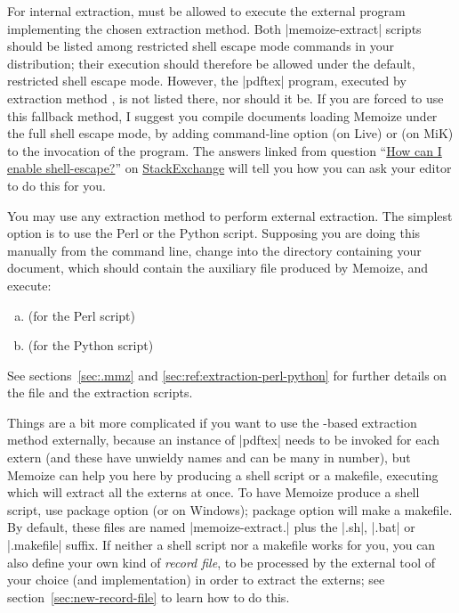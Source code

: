 \documentclass[a4paper,11pt]{article}
\begin{document}
For internal extraction,  must be allowed to execute the external
program implementing the chosen extraction method.  Both |memoize-extract|
scripts should be listed among restricted shell escape mode commands in your
 distribution; their execution should therefore be allowed under
the default, restricted shell escape mode.  However, the |pdftex| program,
executed by extraction method , is not listed there, nor
should it be.  If you are forced to use this fallback method, I suggest you
compile documents loading Memoize under the full shell escape mode, by adding
command-line option  (on Live) or
 (on MiK) to the invocation of the
 program.  The answers linked from question
``\href{https://tex.stackexchange.com/q/598818/16819}{How can I enable
  shell-escape?}''  on \href{https://tex.stackexchange.com}{
  StackExchange} will tell you how you can ask your editor to do this for you.
  
You may use any extraction method to perform external extraction.  The simplest
option is to use the Perl or the Python script.  Supposing you are doing this
manually from the command line, change into the directory containing your
document, which should contain the auxiliary \dmmz file produced by Memoize,
and execute:
  
\begin{enumerate}[(a)]
\item {} \dmmz \hfill (for
  the Perl script)
\item {} \dmmz \hfill (for
  the Python script)
\end{enumerate}

See sections~\ref{sec:.mmz} and \ref{sec:ref:extraction-perl-python} for
further details on the \dmmz file and the extraction scripts.

Things are a bit more complicated if you want to use the -based
extraction method externally, because an instance of |pdftex| needs to be
invoked for each extern (and these have unwieldy names and can be many in
number), but Memoize can help you here by producing a shell script or a
makefile, executing which will extract all the externs at once. To have Memoize
produce a shell script, use package option
 (or
 on Windows); package option
 will make a makefile.  By
default, these files are named |memoize-extract.| plus the
|.sh|, |.bat| or |.makefile| suffix.  If neither a shell script nor a makefile
works for you, you can also define your own kind of \emph{record file}, to be
processed by the external tool of your choice (and implementation) in order to
extract the externs; see section~\ref{sec:new-record-file} to learn how to do
this.
\end{document}
